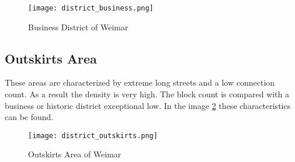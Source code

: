 \begin{figure}[!ht]
    \centering
    \begin{mdframed}[style=mdthight, userdefinedwidth=0.4\textwidth, align=center]
        \texttt{[image: district\_business.png]}
    \end{mdframed}
    \caption{Business District of Weimar}
    \label{fig:business_district}
\end{figure}

\FloatBarrier
\subsection{Outskirts Area}
\label{sec:outskits}
These areas are characterized by extreme long streets and a low connection count. As a result the density is very high. The block count is compared with a business or historic district exceptional low. In the image \ref{fig:outskirts_district} these characteristics can be found.

\begin{figure}[!ht]
    \centering
    \begin{mdframed}[style=mdthight, userdefinedwidth=0.6\textwidth, align=center]
        \texttt{[image: district\_outskirts.png]}
    \end{mdframed}
    \caption{Outskirts Area of Weimar}
    \label{fig:outskirts_district}
\end{figure}